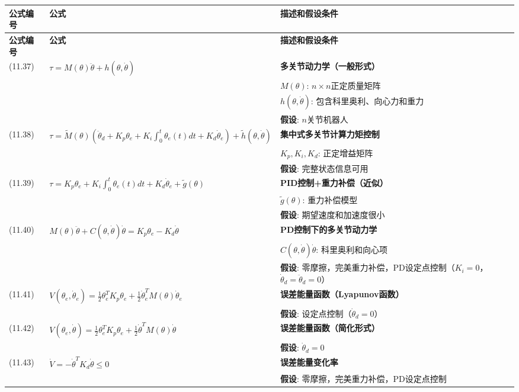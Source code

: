 \documentclass[12pt,a4paper]{article}
\begin{document}
\begin{longtable}{|p{}|p{}|p{}|}
\hline
\textbf{公式编号} & \textbf{公式} & \textbf{描述和假设条件} \\
\hline
\endfirsthead
\hline
\textbf{公式编号} & \textbf{公式} & \textbf{描述和假设条件} \\
\hline
\endhead
\hline
\endfoot
\hline
\endlastfoot

(11.37) & $\tau = M(\theta)\ddot{\theta} + h(\theta, \dot{\theta})$ & 
\textbf{多关节动力学（一般形式）} \\
& & $M(\theta)$: $n \times n$正定质量矩阵 \\
& & $h(\theta, \dot{\theta})$: 包含科里奥利、向心力和重力 \\
& & \textbf{假设}: $n$关节机器人 \\
\hline

(11.38) & $\tau = \tilde{M}(\theta)\left(\ddot{\theta}_d + K_p\theta_e + K_i\int_0^t\theta_e(t)dt + K_d\dot{\theta}_e\right) + \tilde{h}(\theta, \dot{\theta})$ & 
\textbf{集中式多关节计算力矩控制} \\
& & $K_p, K_i, K_d$: 正定增益矩阵 \\
& & \textbf{假设}: 完整状态信息可用 \\
\hline

(11.39) & $\tau = K_p\theta_e + K_i\int_0^t\theta_e(t)dt + K_d\dot{\theta}_e + \tilde{g}(\theta)$ & 
\textbf{PID控制+重力补偿（近似）} \\
& & $\tilde{g}(\theta)$: 重力补偿模型 \\
& & \textbf{假设}: 期望速度和加速度很小 \\
\hline

(11.40) & $M(\theta)\ddot{\theta} + C(\theta, \dot{\theta})\dot{\theta} = K_p\theta_e - K_d\dot{\theta}$ & 
\textbf{PD控制下的多关节动力学} \\
& & $C(\theta, \dot{\theta})\dot{\theta}$: 科里奥利和向心项 \\
& & \textbf{假设}: 零摩擦，完美重力补偿，PD设定点控制（$K_i = 0$，$\dot{\theta}_d = \ddot{\theta}_d = 0$） \\
\hline

(11.41) & $V(\theta_e, \dot{\theta}_e) = \frac{1}{2}\theta_e^T K_p\theta_e + \frac{1}{2}\dot{\theta}_e^T M(\theta)\dot{\theta}_e$ & 
\textbf{误差能量函数（Lyapunov函数）} \\
& & \textbf{假设}: 设定点控制（$\dot{\theta}_d = 0$） \\
\hline

(11.42) & $V(\theta_e, \dot{\theta}) = \frac{1}{2}\theta_e^T K_p\theta_e + \frac{1}{2}\dot{\theta}^T M(\theta)\dot{\theta}$ & 
\textbf{误差能量函数（简化形式）} \\
& & \textbf{假设}: $\dot{\theta}_d = 0$ \\
\hline

(11.43) & $\dot{V} = -\dot{\theta}^T K_d\dot{\theta} \leq 0$ & 
\textbf{误差能量变化率} \\
& & \textbf{假设}: 零摩擦，完美重力补偿，PD设定点控制 \\
\hline

\end{longtable}
\end{document}
